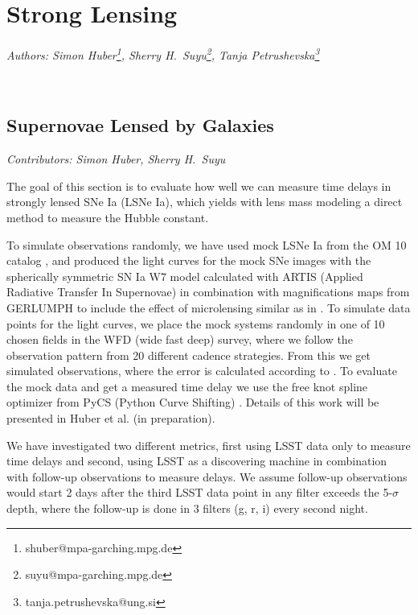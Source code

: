 

\clearpage

\section{Strong Lensing}
\textit{Authors: Simon Huber\footnote{shuber@mpa-garching.mpg.de}, Sherry H.~Suyu\footnote{suyu@mpa-garching.mpg.de}, Tanja Petrushevska\footnote{tanja.petrushevska@ung.si} }

\

\subsection{Supernovae Lensed by Galaxies}
\textit{Contributors: Simon Huber, Sherry H.~Suyu}

The goal of this section is to evaluate how well we can measure time delays in strongly lensed SNe Ia (LSNe Ia), which yields with lens mass modeling a direct method to measure the Hubble constant. 
 
To simulate observations randomly, we have used
mock LSNe Ia from the OM 10 catalog \citep{Oguri:2010},
and produced the light curves for the mock SNe images with
the spherically symmetric SN Ia W7 model \citep{1984:Nomoto}
calculated with ARTIS (Applied Radiative Transfer In Supernovae)
\citep{Kromer:2009ce} in combination with magnifications maps from
GERLUMPH \citep{Vernardos:2015wta} to include the effect of
microlensing similar as in \citep{Goldstein:2017bny}. To simulate
data points for the light curves, we place the mock systems randomly in one of 10 chosen
fields in the WFD (wide fast deep) survey, where we follow the observation pattern from 20 different cadence strategies.
From this we get simulated observations, where the error is calculated according to \cite[sec 3.5,
p. 67]{2009:LSSTscience}.
To evaluate the mock data and get a measured time delay we use the
free knot spline optimizer from PyCS (Python Curve Shifting)
\citep{2013:Tewesb,Bonvin:2015jia}. Details of this
work will be presented in Huber et al. (in preparation).

We have investigated two different metrics, first using LSST data only to measure time delays and second, using LSST as a discovering machine in combination with follow-up observations to measure delays. We assume follow-up observations would start 2 days after the third LSST data point in any filter exceeds the 5-$\sigma$ depth, where the follow-up is done in 3 filters (g, r, i) every second night. 

